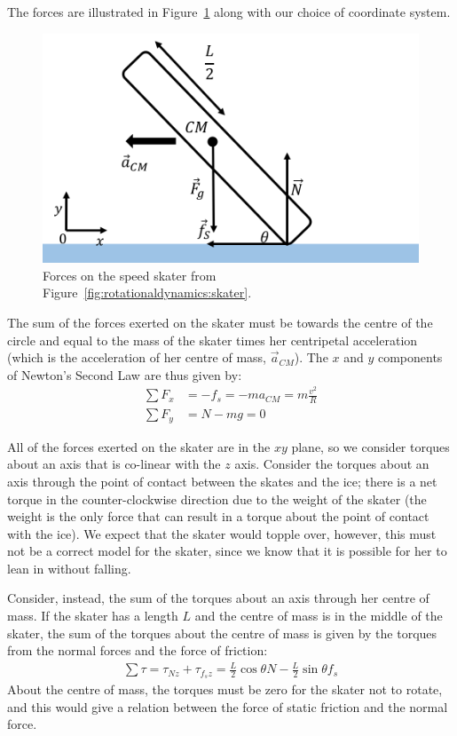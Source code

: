 The forces are illustrated in Figure~\ref{fig:rotationaldynamics:skater_fbd} along with our choice of coordinate system.

\begin{figure}[!htbp]
\centering
\includegraphics[width=0.625\linewidth]{files/skater_fbd-98c8ebbab45d9c93cc3a6b544de6d1e2.png}
\caption[]{Forces on the speed skater from Figure~\ref{fig:rotationaldynamics:skater}.}
\label{fig:rotationaldynamics:skater_fbd}
\end{figure}

The sum of the forces exerted on the skater must be towards the centre of the circle and equal to the mass of the skater times her centripetal acceleration (which is the acceleration of her centre of mass, $\vec a_{CM}$). The $x$ and $y$ components of Newton's Second Law are thus given by:
\begin{align*}
\sum F_x &= -f_s = -ma_{CM} = m\frac{v^2}{R}\\
\sum F_y &= N-mg = 0
\end{align*}

All of the forces exerted on the skater are in the $xy$ plane, so we consider torques about an axis that is co-linear with the $z$ axis. Consider the torques about an axis through the point of contact between the skates and the ice; there is a net torque in the counter-clockwise direction due to the weight of the skater (the weight is the only force that can result in a torque about the point of contact with the ice). We expect that the skater would topple over, however, this must not be a correct model for the skater, since we know that it is possible for her to lean in without falling.

Consider, instead, the sum of the torques about an axis through her centre of mass. If the skater has a length $L$ and the centre of mass is in the middle of the skater, the sum of the torques about the centre of mass is given by the torques from the normal forces and the force of friction:
\begin{align*}
\sum \tau = \tau_{Nz} + \tau_{f_sz} = \frac{L}{2}\cos\theta N - \frac{L}{2}\sin\theta f_s
\end{align*}
About the centre of mass, the torques must be zero for the skater not to rotate, and this would give a relation between the force of static friction and the normal force.

